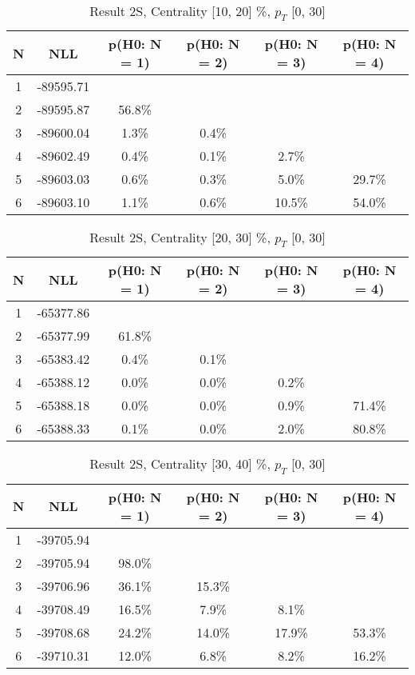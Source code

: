 \begin{table}[htb]
	\begin{center}
	\caption{Result 2S, Centrality [10, 20] \%, $p_{T}$ [0, 30] \GeV
}
{\footnotesize\renewcommand{\arraystretch}{1.4}
		\begin{tabular}{cc||cccc}
			N & NLL & p(H0: N = 1) & p(H0: N = 2) & p(H0: N = 3) & p(H0: N = 4)\\ 
		\hline
1 & -89595.71 & & & & \\
2 & -89595.87 & 56.8\% & & & \\
3 & -89600.04 & 1.3\% & 0.4\% & & \\
4 & -89602.49 & 0.4\% & 0.1\% & 2.7\% & \\
5 & -89603.03 & 0.6\% & 0.3\% & 5.0\% & 29.7\% \\
6 & -89603.10 & 1.1\% & 0.6\% & 10.5\% & 54.0\% \\
	\end{tabular}
		\label{tab:lab}
	}
	\end{center}\end{table}

\begin{table}[htb]
	\begin{center}
	\caption{Result 2S, Centrality [20, 30] \%, $p_{T}$ [0, 30] \GeV
}
{\footnotesize\renewcommand{\arraystretch}{1.4}
		\begin{tabular}{cc||cccc}
			N & NLL & p(H0: N = 1) & p(H0: N = 2) & p(H0: N = 3) & p(H0: N = 4)\\ 
		\hline
1 & -65377.86 & & & & \\
2 & -65377.99 & 61.8\% & & & \\
3 & -65383.42 & 0.4\% & 0.1\% & & \\
4 & -65388.12 & 0.0\% & 0.0\% & 0.2\% & \\
5 & -65388.18 & 0.0\% & 0.0\% & 0.9\% & 71.4\% \\
6 & -65388.33 & 0.1\% & 0.0\% & 2.0\% & 80.8\% \\
	\end{tabular}
		\label{tab:lab}
	}
	\end{center}\end{table}

\begin{table}[htb]
	\begin{center}
	\caption{Result 2S, Centrality [30, 40] \%, $p_{T}$ [0, 30] \GeV
}
{\footnotesize\renewcommand{\arraystretch}{1.4}
		\begin{tabular}{cc||cccc}
			N & NLL & p(H0: N = 1) & p(H0: N = 2) & p(H0: N = 3) & p(H0: N = 4)\\ 
		\hline
1 & -39705.94 & & & & \\
2 & -39705.94 & 98.0\% & & & \\
3 & -39706.96 & 36.1\% & 15.3\% & & \\
4 & -39708.49 & 16.5\% & 7.9\% & 8.1\% & \\
5 & -39708.68 & 24.2\% & 14.0\% & 17.9\% & 53.3\% \\
6 & -39710.31 & 12.0\% & 6.8\% & 8.2\% & 16.2\% \\
	\end{tabular}
		\label{tab:lab}
	}
	\end{center}\end{table}

